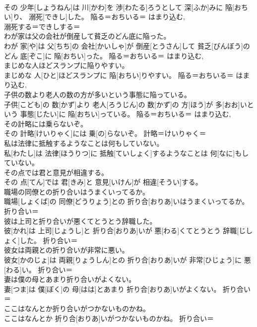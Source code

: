 \documentclass[8pt]{extreport}
\begin{document}
\begin{CJK}{UTF8}{min}
\\	その 少年[しょうねん]は 川[かわ]を 渉[わたる]ろうとして 深[ふか]みに 陥[おちい]り、 溺死[できし]した。	陥る＝おちいる＝ はまり込む, 
\\	溺死する＝できしする＝ 
\\	わが家は父の会社が倒産して貧乏のどん底に陥った。	
\\	わが 家[や]は 父[ちち]の 会社[かいしゃ]が 倒産[とうさん]して 貧乏[びんぼう]のどん 底[ぞこ]に 陥[おちい]った。	陥る＝おちいる＝ はまり込む, 
\\	まじめな人ほどスランプに陥りやすい。	
\\	まじめな 人[ひと]ほどスランプに 陥[おちい]りやすい。	陥る＝おちいる＝ はまり込む, 
\\	子供の数より老人の数の方が多いという事態に陥っている。	
\\	子供[こども]の 数[かず]より 老人[ろうじん]の 数[かず]の 方[ほう]が 多[おお]いという 事態[じたい]に 陥[おちい]っている。	陥る＝おちいる＝ はまり込む, 
\\	その計略には乗らないぞ。	
\\	その 計略[けいりゃく]には 乗[の]らないぞ。	計略＝けいりゃく＝ 
\\	私は法律に抵触するようなことは何もしていない。	
\\	私[わたし]は 法律[ほうりつ]に 抵触[ていしょく]するようなことは 何[なに]もしていない。	
\\	その点では君と意見が相違する。	
\\	その 点[てん]では 君[きみ]と 意見[いけん]が 相違[そうい]する。	
\\	職場の同僚との折り合いはうまくいってるか。	
\\	職場[しょくば]の 同僚[どうりょう]との 折り合[おりあ]いはうまくいってるか。	折り合い＝ 
\\	彼は上司と折り合いが悪くてとうとう辞職した。	
\\	彼[かれ]は 上司[じょうし]と 折り合[おりあ]いが 悪[わる]くてとうとう 辞職[じしょく]した。	折り合い＝ 
\\	彼女は両親との折り合いが非常に悪い。	
\\	彼女[かのじょ]は 両親[りょうしん]との 折り合[おりあ]いが 非常[ひじょう]に 悪[わる]い。	折り合い＝ 
\\	妻は僕の母とあまり折り合いがよくない。	
\\	妻[つま]は 僕[ぼく]の 母[はは]とあまり 折り合[おりあ]いがよくない。	折り合い＝ 
\\	ここはなんとか折り合いがつかないものかね。	
\\	ここはなんとか 折り合[おりあ]いがつかないものかね。	折り合い＝ 

\end{CJK}
\end{document}
